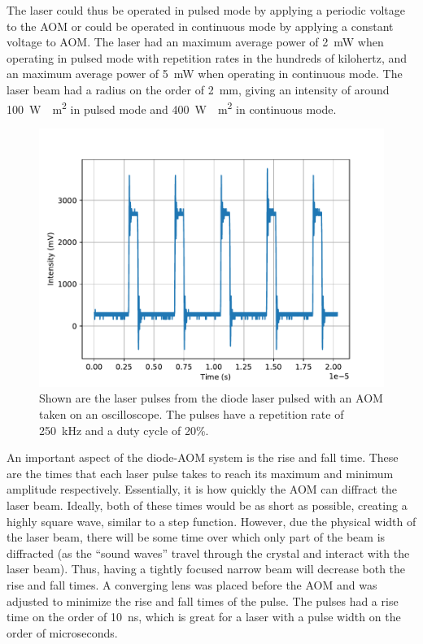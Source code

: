 The laser could thus be operated in pulsed mode by applying a periodic voltage to the AOM or could be operated in continuous mode by applying a constant voltage to AOM. The laser had an maximum average power of \SI{2}{\milli W} when operating in pulsed mode with repetition rates in the hundreds of kilohertz, and an maximum average power of \SI{5}{\milli W} when operating in continuous mode. The laser beam had a radius on the order of \SI{2}{\milli \meter}, giving an intensity of around \SI{100}{W \per \meter \squared} in pulsed mode and \SI{400}{W \per \meter \squared} in continuous mode.

\begin{figure}[ht!]
		\centering
		\includegraphics[width = .8\textwidth]{Images/diodepulse.pdf}
		\caption{Shown are the laser pulses from the diode laser pulsed with an AOM taken on an oscilloscope. The pulses have a repetition rate of \SI{250}{ kHz} and a duty cycle of 20\%.}
		\label{fig:diodepulse1}
\end{figure}


An important aspect of the diode-AOM system is the rise and fall time. These are the times that each laser pulse takes to reach its maximum and minimum amplitude respectively. Essentially, it is how quickly the AOM can diffract the laser beam. Ideally, both of these times would be as short as possible, creating a highly square wave, similar to a step function. However, due the physical width of the laser beam, there will be some time over which only part of the beam is diffracted (as the ``sound waves'' travel through the crystal and interact with the laser beam). Thus, having a tightly focused narrow beam will decrease both the rise and fall times. A converging lens was placed before the AOM and was adjusted to minimize the rise and fall times of the pulse. The pulses had a rise time on the order of \SI{10}{\nano \second}, which is great for a laser with a pulse width on the order of microseconds. 

